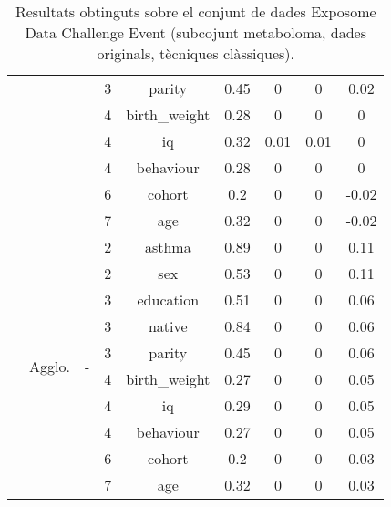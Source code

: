 \documentclass[CAT,BIB]{TFUOC}%
\begin{document}
\begin{table}
\begin{tabular}{@{}ccccccccc@{}}
            &  &  & 3 & parity & 0.45 & 0 & 0 & 0.02 \\
            &  &  & 4 & birth\_weight & 0.28 & 0 & 0 & 0 \\
            &  &  & 4 & iq & 0.32 & 0.01 & 0.01 & 0 \\
            &  &  & 4 & behaviour & 0.28 & 0 & 0 & 0 \\
            &  &  & 6 & cohort & 0.2 & 0 & 0 & -0.02 \\
            &  &  & 7 & age & 0.32 & 0 & 0 & -0.02 \\ \cmidrule(l){2-9}
            & \multirow{10}{*}{Agglo.} & \multirow{10}{*}{-} & 2 & asthma & 0.89 & 0 & 0 & 0.11 \\
            &  &  & 2 & sex & 0.53 & 0 & 0 & 0.11 \\
            &  &  & 3 & education & 0.51 & 0 & 0 & 0.06 \\
            &  &  & 3 & native & 0.84 & 0 & 0 & 0.06 \\
            &  &  & 3 & parity & 0.45 & 0 & 0 & 0.06 \\
            &  &  & 4 & birth\_weight & 0.27 & 0 & 0 & 0.05 \\
            &  &  & 4 & iq & 0.29 & 0 & 0 & 0.05 \\
            &  &  & 4 & behaviour & 0.27 & 0 & 0 & 0.05 \\
            &  &  & 6 & cohort & 0.2 & 0 & 0 & 0.03 \\
            &  &  & 7 & age & 0.32 & 0 & 0 & 0.03 \\ \bottomrule
        \end{tabular}
        \caption[Exposome Data Challenge Event: resultats - part 1]{
            Resultats obtinguts sobre el conjunt de dades Exposome Data Challenge Event
            (subcojunt metaboloma, dades originals, tècniques clàssiques).
        }
        \label{t:results_exposome1}
    \end{table}
\end{document}

